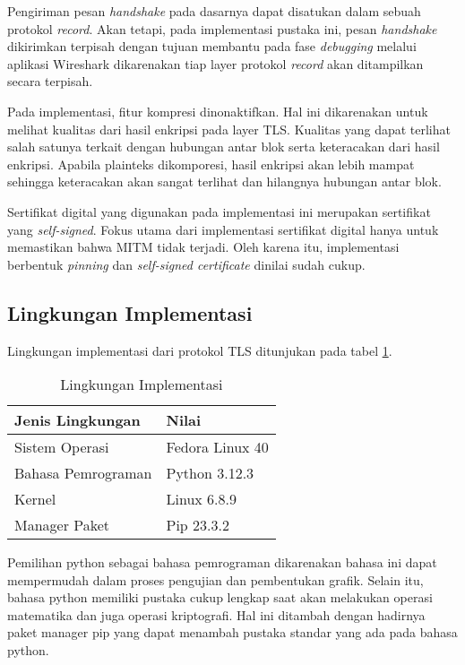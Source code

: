 Pengiriman pesan \emph{handshake} pada dasarnya dapat disatukan dalam sebuah protokol \emph{record}. Akan tetapi, pada implementasi pustaka ini, pesan \emph{handshake} dikirimkan terpisah dengan tujuan  membantu pada fase \emph{debugging} melalui aplikasi Wireshark dikarenakan tiap layer protokol \emph{record} akan ditampilkan secara terpisah.

Pada implementasi, fitur kompresi dinonaktifkan. Hal ini dikarenakan untuk melihat kualitas dari hasil enkripsi pada layer TLS. Kualitas yang dapat terlihat salah satunya terkait dengan hubungan antar blok serta keteracakan dari hasil enkripsi. Apabila plainteks dikomporesi, hasil enkripsi akan lebih mampat sehingga keteracakan akan sangat terlihat dan hilangnya hubungan antar blok.

Sertifikat digital yang digunakan pada implementasi ini merupakan sertifikat yang \emph{self-signed}. Fokus utama dari implementasi sertifikat digital hanya untuk memastikan bahwa MITM tidak terjadi. Oleh karena itu, implementasi berbentuk \emph{pinning} dan \emph{self-signed certificate} dinilai sudah cukup.

\subsection{Lingkungan Implementasi}

Lingkungan implementasi dari protokol TLS ditunjukan pada tabel \ref{tab:impl.env}.

\begin{table}[!h]
  \centering
  \caption{Lingkungan Implementasi} \label{tab:impl.env}
  \begin{tabular}{|p{3cm}|p{6cm}|}
    \hline
    Jenis Lingkungan & Nilai \\ \hline
    Sistem Operasi & Fedora Linux 40 \\ \hline
    Bahasa Pemrograman & Python 3.12.3 \\ \hline
    Kernel & Linux 6.8.9 \\ \hline
    Manager Paket & Pip 23.3.2 \\ \hline
  \end{tabular}
\end{table}

Pemilihan python sebagai bahasa pemrograman dikarenakan bahasa ini dapat mempermudah dalam proses pengujian dan pembentukan grafik. Selain itu, bahasa python memiliki pustaka cukup lengkap saat akan melakukan operasi matematika dan juga operasi kriptografi. Hal ini ditambah dengan hadirnya paket manager pip yang dapat menambah pustaka standar yang ada pada bahasa python.

